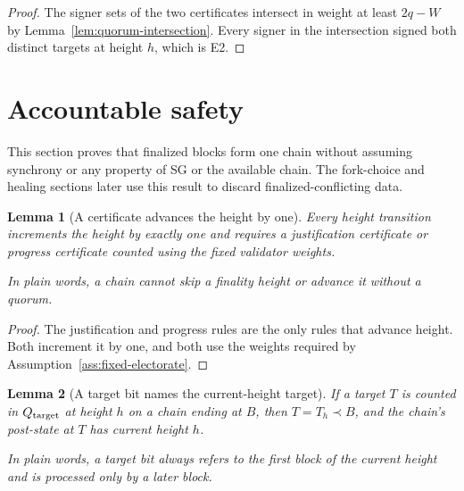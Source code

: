 \ifx\litemode\undefined\documentclass{article}\fi
\theoremstyle{plain}
\newtheorem{lemma}{Lemma}
\theoremstyle{definition}
\theoremstyle{remark}
\begin{document}
\begin{proof}
The signer sets of the two certificates intersect in weight at least
\(2q-W\) by Lemma~\ref{lem:quorum-intersection}.  Every signer in the
intersection signed both distinct targets at height \(h\), which is E2.
\end{proof}

\section{Accountable safety}\label{sec:safety}

This section proves that finalized blocks form one chain without assuming
synchrony or any property of SG or the available chain.  The fork-choice and
healing sections later use this result to discard finalized-conflicting data.

\begin{lemma}[A certificate advances the height by one]\label{lem:height-progression}
Every height transition increments the height by exactly one and requires a
justification certificate or progress certificate counted using the fixed
validator weights.

In plain words, a chain cannot skip a finality height or advance it without a
quorum.
\end{lemma}

\begin{proof}
The justification and progress rules are the only rules that advance height.  Both
increment it by one, and both use the weights required by
Assumption~\ref{ass:fixed-electorate}.
\end{proof}

\begin{lemma}[A target bit names the current-height target]\label{lem:height-target-freshness}
If a target \(T\) is counted in \(Q_{\rm target}\) at height \(h\) on a chain
ending at \(B\), then \(T=T_h\prec B\), and the chain's post-state at \(T\)
has current height \(h\).

In plain words, a target bit always refers to the first block of the current
height and is processed only by a later block.
\end{lemma}
\end{document}
